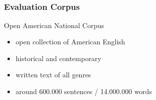 \documentclass{presentation}
\begin{document}
\subsection{}

\begin{frame}
  \frametitle{Evaluation Corpus}

  \large
  Open American National Corpus {\small\parencite{OANC}}
  \begin{itemize}
    \item open collection of American English
    \item historical and contemporary
    \item written text of all genres
    \item around 600.000 sentences / 14.000.000 words
  \end{itemize}
\end{frame}
\end{document}

